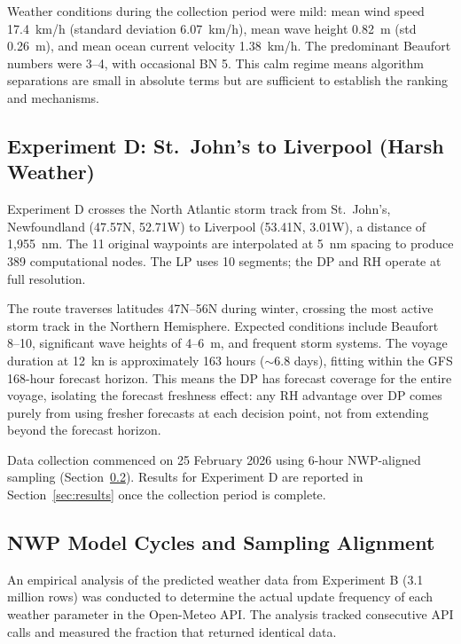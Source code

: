 \documentclass[review]{elsarticle}
\begin{document}
Weather conditions during the collection period were mild: mean wind speed 17.4~km/h (standard deviation 6.07~km/h), mean wave height 0.82~m (std 0.26~m), and mean ocean current velocity 1.38~km/h. The predominant Beaufort numbers were 3--4, with occasional BN 5. This calm regime means algorithm separations are small in absolute terms but are sufficient to establish the ranking and mechanisms.

\subsection{Experiment D: St.\ John's to Liverpool (Harsh Weather)}
\label{sec:exp-d}

Experiment D crosses the North Atlantic storm track from St.\ John's, Newfoundland (47.57\degree{}N, 52.71\degree{}W) to Liverpool (53.41\degree{}N, 3.01\degree{}W), a distance of 1,955~nm. The 11 original waypoints are interpolated at 5~nm spacing to produce 389 computational nodes. The LP uses 10 segments; the DP and RH operate at full resolution.

The route traverses latitudes 47\degree{}N--56\degree{}N during winter, crossing the most active storm track in the Northern Hemisphere. Expected conditions include Beaufort 8--10, significant wave heights of 4--6~m, and frequent storm systems. The voyage duration at 12~kn is approximately 163 hours ($\sim$6.8 days), fitting within the GFS 168-hour forecast horizon. This means the DP has forecast coverage for the entire voyage, isolating the forecast freshness effect: any RH advantage over DP comes purely from using fresher forecasts at each decision point, not from extending beyond the forecast horizon.

Data collection commenced on 25 February 2026 using 6-hour NWP-aligned sampling (Section~\ref{sec:nwp-cycles}). Results for Experiment D are reported in Section~\ref{sec:results} once the collection period is complete.


\subsection{NWP Model Cycles and Sampling Alignment}
\label{sec:nwp-cycles}

An empirical analysis of the predicted weather data from Experiment B (3.1 million rows) was conducted to determine the actual update frequency of each weather parameter in the Open-Meteo API. The analysis tracked consecutive API calls and measured the fraction that returned identical data.
\end{document}
